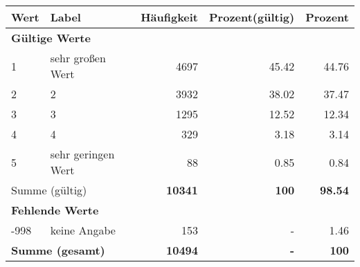      \begin{longtable}{lXrrr}
     \toprule
     \textbf{Wert} & \textbf{Label} & \textbf{Häufigkeit} & \textbf{Prozent(gültig)} & \textbf{Prozent} \\
     \endhead
     \midrule
     \multicolumn{5}{l}{\textbf{Gültige Werte}}\\

     1 &
     \multicolumn{1}{X}{ sehr großen Wert   } &


       \num{4697} &
       \num[round-mode=places,round-precision=2]{45,42} &
         \num[round-mode=places,round-precision=2]{44,76} \\

     2 &
     \multicolumn{1}{X}{ 2   } &


       \num{3932} &
       \num[round-mode=places,round-precision=2]{38,02} &
         \num[round-mode=places,round-precision=2]{37,47} \\

     3 &
     \multicolumn{1}{X}{ 3   } &


       \num{1295} &
       \num[round-mode=places,round-precision=2]{12,52} &
         \num[round-mode=places,round-precision=2]{12,34} \\

     4 &
     \multicolumn{1}{X}{ 4   } &


       \num{329} &
       \num[round-mode=places,round-precision=2]{3,18} &
         \num[round-mode=places,round-precision=2]{3,14} \\

     5 &
     \multicolumn{1}{X}{ sehr geringen Wert   } &


       \num{88} &
       \num[round-mode=places,round-precision=2]{0,85} &
         \num[round-mode=places,round-precision=2]{0,84} \\
     \midrule
     \multicolumn{2}{l}{Summe (gültig)} &
       \textbf{\num{10341}} &
     \textbf{100} &
       \textbf{\num[round-mode=places,round-precision=2]{98,54}} \\
     \multicolumn{5}{l}{\textbf{Fehlende Werte}}\\
       -998 &
       keine Angabe &
         \num{153} &
        - &
         \num[round-mode=places,round-precision=2]{1,46} \\
     \midrule
     \multicolumn{2}{l}{\textbf{Summe (gesamt)}} &
          \textbf{\num{10494}} &
        \textbf{-} &
        \textbf{100} \\
     \bottomrule
     \end{longtable}
     
